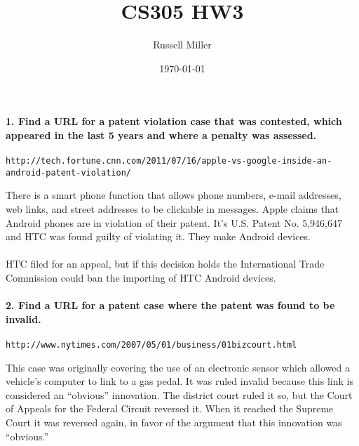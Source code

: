 \documentclass{article}
\title{CS305 HW3}
\author{Russell Miller}
\date{\today}
\begin{document}
\maketitle

\paragraph{1. Find a URL for a patent violation case that was contested, 
which appeared in the last 5 years and where a penalty was assessed.}
\begin{verbatim}
http://tech.fortune.cnn.com/2011/07/16/apple-vs-google-inside-an-android-patent-violation/
\end{verbatim}
There is a smart phone function that allows phone numbers, e-mail addresses, 
web links, and street addresses to be clickable in messages. Apple claims that 
Android phones are in violation of their patent. It's U.S. Patent No. 5,946,647 
and HTC was found guilty of violating it. They make Android devices.\\
\\
HTC filed for an appeal, but if this decision holds the International Trade 
Commission could ban the importing of HTC Android devices.

\paragraph{2. Find a URL for a patent case where the patent was found to be invalid.}
\begin{verbatim}
http://www.nytimes.com/2007/05/01/business/01bizcourt.html
\end{verbatim}
This case was originally covering the use of an electronic sensor which allowed
a vehicle's computer to link to a gas pedal. It was ruled invalid because this link
is considered an ``obvious'' innovation. The district court ruled it so, but the Court of 
Appeals for the Federal Circuit reversed it. When it reached the Supreme Court it
was reversed again, in favor of the argument that this innovation was ``obvious.''
\end{document}

